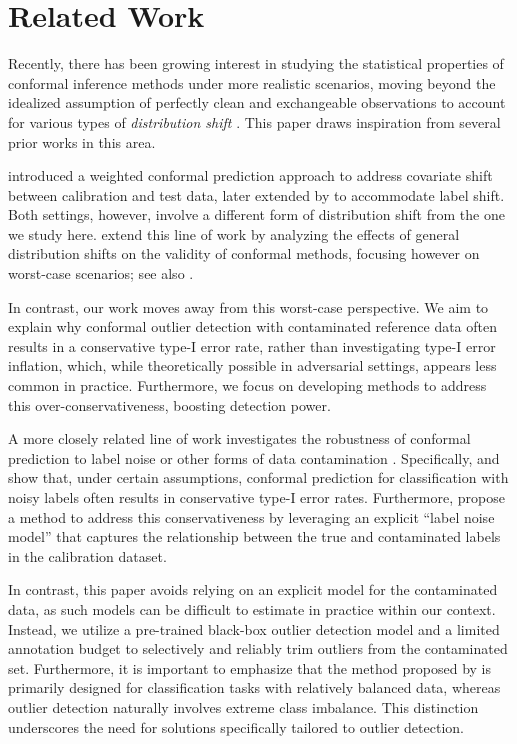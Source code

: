 \section{Related Work}
Recently, there has been growing interest in studying the statistical properties of conformal inference methods under more realistic scenarios, moving beyond the idealized assumption of perfectly clean and exchangeable observations to account for various types of {\em distribution shift} \citep{tibshirani2019conformal,einbinder2022conformal,sesia2023adaptive,barber2023conformal,gibbs2021adaptive,zaffran2022adaptive,feldman2022achieving,gibbs2024conformal,podkopaev2021distribution,si2023pac,prinsterconformal}. This paper draws inspiration from several prior works in this area.

\citet{tibshirani2019conformal} introduced a weighted conformal prediction approach to address covariate shift between calibration and test data, later extended by \citet{podkopaev2021distribution} to accommodate label shift. Both settings, however, involve a different form of distribution shift from the one we study here. \citet{barber2023conformal} extend this line of work by analyzing the effects of general distribution shifts on the validity of conformal methods, focusing however on worst-case scenarios; see also \citet{farinhas2024nonexchangeable}.

In contrast, our work moves away from this worst-case perspective. We aim to explain why conformal outlier detection with contaminated reference data often results in a conservative type-I error rate, rather than investigating type-I error inflation, which, while theoretically possible in adversarial settings, appears less common in practice. Furthermore, we focus on developing methods to address this over-conservativeness, boosting detection power.

A more closely related line of work investigates the robustness of conformal prediction to label noise \cite{einbinder2022conformal, sesia2023adaptive, clarkson2024splitconformalpredictiondata,penso2025estimating} or other forms of data contamination \cite{pmlr-v202-zaffran23a, zaffran2024predictive, feldman2024robust}. Specifically, \citet{einbinder2022conformal} and \citet{sesia2023adaptive} show that, under certain assumptions, conformal prediction for classification with noisy labels often results in conservative type-I error rates. Furthermore, \citet{sesia2023adaptive} propose a method to address this conservativeness by leveraging an explicit ``label noise model'' that captures the relationship between the true and contaminated labels in the calibration dataset.

In contrast, this paper avoids relying on an explicit model for the contaminated data, as such models can be difficult to estimate in practice within our context. Instead, we utilize a pre-trained black-box outlier detection model and a limited annotation budget to selectively and reliably trim outliers from the contaminated set. Furthermore, it is important to emphasize that the method proposed by \citet{sesia2023adaptive} is primarily designed for classification tasks with relatively balanced data, whereas outlier detection naturally involves extreme class imbalance. This distinction underscores the need for solutions specifically tailored to outlier detection.